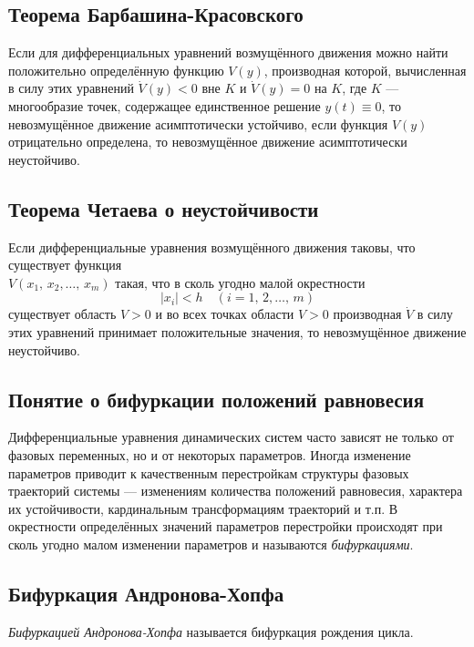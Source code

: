 \documentclass[a4paper]{article}
\begin{document}
\subsection{Теорема Барбашина-Красовского}
\begin{thm}
	Если для дифференциальных уравнений возмущённого движения можно найти
	положительно определённую функцию $V(y)$, производная которой,
	вычисленная в силу этих уравнений $\dot{V}(y)<0$ вне $K$ и
	$\dot{V}(y)=0$ на $K$, где $K$  --- многообразие точек, содержащее
	единственное решение $y(t) \equiv 0$, то невозмущённое движение
	асимптотически устойчиво, если функция $V(y)$ отрицательно определена,
	то невозмущённое движение асимптотически неустойчиво.
\end{thm}
\subsection{Теорема Четаева о неустойчивости}
\begin{thm}
	Если дифференциальные уравнения возмущённого движения таковы, что
	существует функция\\$V(x_1,\,x_2,\ldots,\,x_m)$
	такая, что в сколь угодно
	малой  окрестности
	 \[
		 |x_i|<h \quad (i=1,\,2,\ldots,\,m)
	\] 
	существует область $V>0$ и во всех точках области $V>0$ производная
	$\dot{V}$ в силу этих уравнений принимает положительные значения, то
	невозмущённое движение неустойчиво.
\end{thm}
\subsection{Понятие о бифуркации положений равновесия}
Дифференциальные уравнения динамических систем часто зависят не только от
фазовых переменных, но и от некоторых параметров.
Иногда изменение параметров приводит к качественным перестройкам  структуры
фазовых траекторий системы --- изменениям количества положений равновесия,
характера их устойчивости, кардинальным трансформациям траекторий и т.\;п.
В окрестности определённых значений параметров перестройки происходят при
сколь угодно малом изменении параметров и называются \emph{бифуркациями}.
\subsection{Бифуркация Андронова-Хопфа}
\emph{Бифуркацией Андронова-Хопфа} называется бифуркация рождения цикла.
\end{document}

